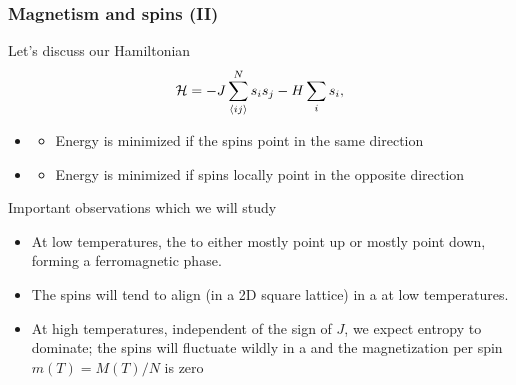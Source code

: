 \documentclass[hyperref={colorlinks=true}]{beamer}
\begin{document}
\begin{frame}%
  \frametitle{Magnetism and spins (II)}

  Let's discuss our Hamiltonian
  \begin{equation}
    \mathcal{H} = -J \sum_{\langle ij \rangle}^N s_i s_{j} - H \sum_i s_i , \label{eq:ising-field}
  \end{equation} 
  \begin{itemize}
    \item {}
    \begin{itemize}
      \item Energy is minimized if the spins point in the same direction
    \end{itemize}
    \item {}
    \begin{itemize}
      \item Energy is minimized if spins locally point in the opposite direction
    \end{itemize}
  \end{itemize}
  
  \begin{ucblock}{Important observations which we will study}
    \begin{itemize}
      \item At low temperatures, the  to either mostly point up or mostly point down, forming a ferromagnetic phase.
      \item The spins will tend to align (in a 2D square lattice) in a  at low temperatures. 
      \item At high temperatures, independent of the sign of $J$, we expect entropy to dominate; the spins will fluctuate wildly in a  and the magnetization per spin $m(T ) = M (T )/N$ is zero 
    \end{itemize}
  \end{ucblock}
    
\end{frame}

\end{document}
